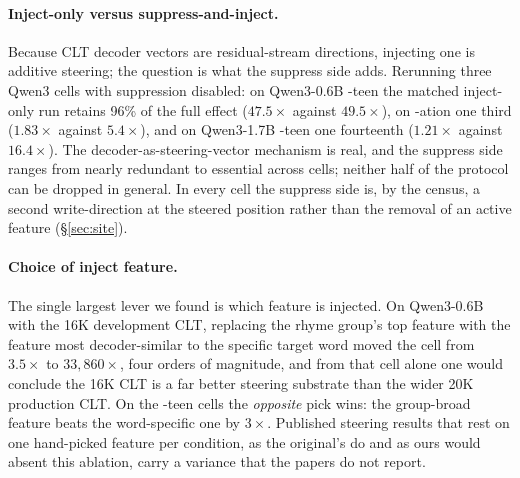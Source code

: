 \documentclass[11pt]{article}
\begin{document}
\paragraph{Inject-only versus suppress-and-inject.}
Because CLT decoder vectors are residual-stream directions, injecting one is additive steering; the question is what the suppress side adds. Rerunning three Qwen3 cells with suppression disabled: on Qwen3-0.6B -teen the matched inject-only run retains 96\% of the full effect ($47.5\times$ against $49.5\times$), on -ation one third ($1.83\times$ against $5.4\times$), and on Qwen3-1.7B -teen one fourteenth ($1.21\times$ against $16.4\times$). The decoder-as-steering-vector mechanism is real, and the suppress side ranges from nearly redundant to essential across cells; neither half of the protocol can be dropped in general. In every cell the suppress side is, by the census, a second write-direction at the steered position rather than the removal of an active feature (\S\ref{sec:site}).

\paragraph{Choice of inject feature.}
The single largest lever we found is which feature is injected. On Qwen3-0.6B with the 16K development CLT, replacing the rhyme group's top feature with the feature most decoder-similar to the specific target word moved the cell from $3.5\times$ to $33{,}860\times$, four orders of magnitude, and from that cell alone one would conclude the 16K CLT is a far better steering substrate than the wider 20K production CLT. On the -teen cells the \emph{opposite} pick wins: the group-broad feature beats the word-specific one by $3\times$. Published steering results that rest on one hand-picked feature per condition, as the original's do and as ours would absent this ablation, carry a variance that the papers do not report.
\end{document}
